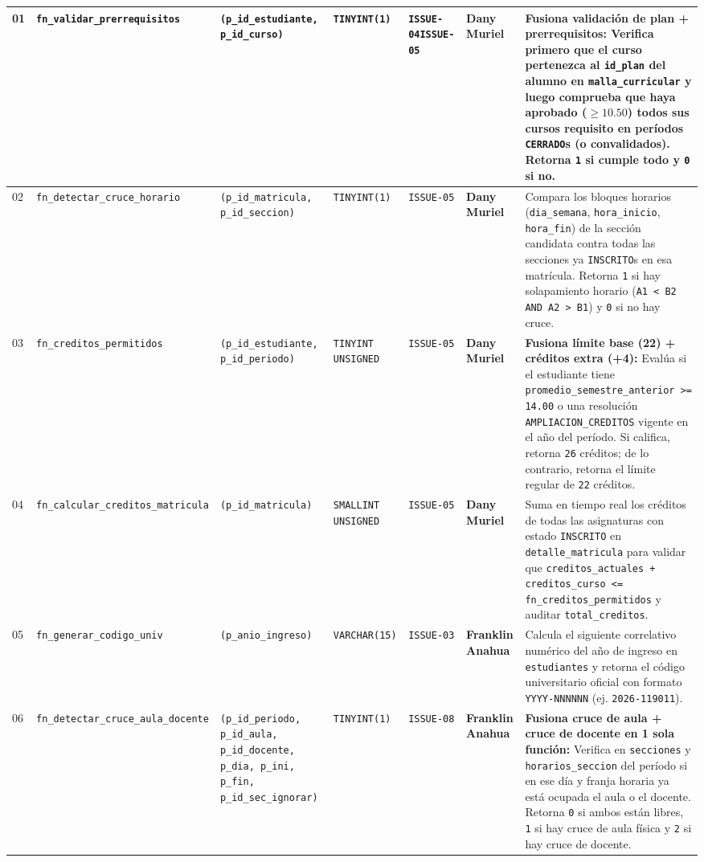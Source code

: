 \documentclass[10pt,a4paper,landscape]{article}
\newcommand{\devDany}{\textbf{\textcolor{unjbgNavy}{Dany Muriel}} \newline {\scriptsize(Lead / QA)}}
\newcommand{\devFranklin}{\textbf{\textcolor{teal!80!black}{Franklin Anahua}} \newline {\scriptsize(Backend / DB)}}
\begin{document}
\begin{longtable}{|p{0.5cm}|p{4.8cm}|p{4.3cm}|p{2.3cm}|p{2.2cm}|p{2.6cm}|p{8.5cm}|}
01 & \texttt{fn\_validar\_prerrequisitos} & \texttt{(p\_id\_estudiante, p\_id\_curso)} & \texttt{TINYINT(1)} & \texttt{ISSUE-04}\newline \texttt{ISSUE-05} & \devDany & \textbf{Fusiona validación de plan + prerrequisitos:} Verifica primero que el curso pertenezca al \texttt{id\_plan} del alumno en \texttt{malla\_curricular} y luego comprueba que haya aprobado ($\ge 10.50$) todos sus cursos requisito en períodos \texttt{CERRADO}s (o convalidados). Retorna \texttt{1} si cumple todo y \texttt{0} si no. \\
\hline
\rowcolor{rowAlt}
02 & \texttt{fn\_detectar\_cruce\_horario} & \texttt{(p\_id\_matricula, p\_id\_seccion)} & \texttt{TINYINT(1)} & \texttt{ISSUE-05} & \devDany & Compara los bloques horarios (\texttt{dia\_semana}, \texttt{hora\_inicio}, \texttt{hora\_fin}) de la sección candidata contra todas las secciones ya \texttt{INSCRITO}s en esa matrícula. Retorna \texttt{1} si hay solapamiento horario (\texttt{A1 < B2 AND A2 > B1}) y \texttt{0} si no hay cruce. \\
\hline
03 & \texttt{fn\_creditos\_permitidos} & \texttt{(p\_id\_estudiante, p\_id\_periodo)} & \texttt{TINYINT UNSIGNED} & \texttt{ISSUE-05} & \devDany & \textbf{Fusiona límite base (22) + créditos extra (+4):} Evalúa si el estudiante tiene \texttt{promedio\_semestre\_anterior >= 14.00} o una resolución \texttt{AMPLIACION\_CREDITOS} vigente en el año del período. Si califica, retorna \texttt{26} créditos; de lo contrario, retorna el límite regular de \texttt{22} créditos. \\
\hline
\rowcolor{rowAlt}
04 & \texttt{fn\_calcular\_creditos\_matricula} & \texttt{(p\_id\_matricula)} & \texttt{SMALLINT UNSIGNED} & \texttt{ISSUE-05} & \devDany & Suma en tiempo real los créditos de todas las asignaturas con estado \texttt{INSCRITO} en \texttt{detalle\_matricula} para validar que \texttt{creditos\_actuales + creditos\_curso <= fn\_creditos\_permitidos} y auditar \texttt{total\_creditos}. \\
\hline
05 & \texttt{fn\_generar\_codigo\_univ} & \texttt{(p\_anio\_ingreso)} & \texttt{VARCHAR(15)} & \texttt{ISSUE-03} & \devFranklin & Calcula el siguiente correlativo numérico del año de ingreso en \texttt{estudiantes} y retorna el código universitario oficial con formato \texttt{YYYY-NNNNNN} (ej. \texttt{2026-119011}). \\
\hline
\rowcolor{rowAlt}
06 & \texttt{fn\_detectar\_cruce\_aula\_docente} & \texttt{(p\_id\_periodo, p\_id\_aula, p\_id\_docente, p\_dia, p\_ini, p\_fin, p\_id\_sec\_ignorar)} & \texttt{TINYINT(1)} & \texttt{ISSUE-08} & \devFranklin & \textbf{Fusiona cruce de aula + cruce de docente en 1 sola función:} Verifica en \texttt{secciones} y \texttt{horarios\_seccion} del período si en ese día y franja horaria ya está ocupada el aula o el docente. Retorna \texttt{0} si ambos están libres, \texttt{1} si hay cruce de aula física y \texttt{2} si hay cruce de docente. \\

\end{longtable}
\end{document}
